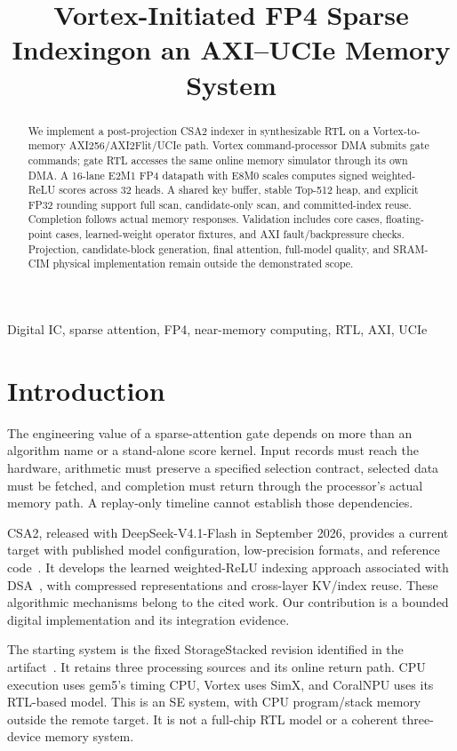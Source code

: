 \documentclass[conference]{IEEEtran}
\title{Vortex-Initiated FP4 Sparse Indexing\newline on an AXI--UCIe Memory System}
\author{\IEEEauthorblockN{Anonymous Artifact Authors}\IEEEauthorblockA{Digital hardware design and reproducibility study}}
\begin{document}
\maketitle
\begin{abstract}
We implement a post-projection CSA2 indexer in synthesizable RTL on a Vortex-to-memory AXI256/AXI2Flit/UCIe path. Vortex command-processor DMA submits gate commands; gate RTL accesses the same online memory simulator through its own DMA. A 16-lane E2M1 FP4 datapath with E8M0 scales computes signed weighted-ReLU scores across 32 heads. A shared key buffer, stable Top-512 heap, and explicit FP32 rounding support full scan, candidate-only scan, and committed-index reuse. Completion follows actual memory responses.  Validation includes \CoreCaseCount{} core cases, \FpCaseCount{} floating-point cases, learned-weight operator fixtures, and AXI fault/backpressure checks. Projection, candidate-block generation, final attention, full-model quality, and SRAM-CIM physical implementation remain outside the demonstrated scope.
\end{abstract}
\begin{IEEEkeywords}
Digital IC, sparse attention, FP4, near-memory computing, RTL, AXI, UCIe
\end{IEEEkeywords}

\section{Introduction}
The engineering value of a sparse-attention gate depends on more than an algorithm name or a stand-alone score kernel. Input records must reach the hardware, arithmetic must preserve a specified selection contract, selected data must be fetched, and completion must return through the processor's actual memory path. A replay-only timeline cannot establish those dependencies.

CSA2, released with DeepSeek-V4.1-Flash in September 2026, provides a current target with published model configuration, low-precision formats, and reference code~\cite{csa2,csa2code}. It develops the learned weighted-ReLU indexing approach associated with DSA~\cite{dsa}, with compressed representations and cross-layer KV/index reuse. These algorithmic mechanisms belong to the cited work. Our contribution is a bounded digital implementation and its integration evidence.

The starting system is the fixed StorageStacked revision identified in the artifact~\cite{upstream}. It retains three processing sources and its online return path. CPU execution uses gem5's timing CPU, Vortex uses SimX, and CoralNPU uses its RTL-based model. This is an SE system, with CPU program/stack memory outside the remote target. It is not a full-chip RTL model or a coherent three-device memory system.
\end{document}
